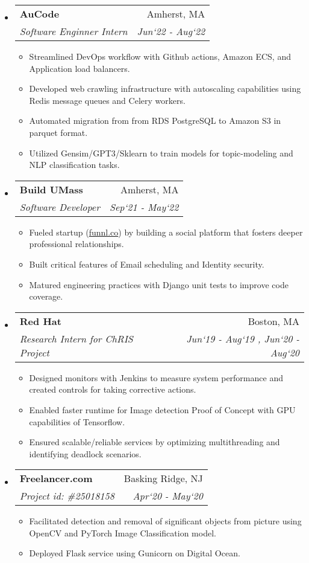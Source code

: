 \documentclass[letterpaper,8pt]{article}
\makeatletter
\newcommand{\resitem}[1]{\item #1 \vspace{-1pt}}
\newcommand{\resheading}[1]{{\normalsize \parashade[.9]{sharpcorners}{\textbf{#1 \vphantom{p\^{E}}}}}}
\newcommand{\ressubheading}[4]{
\begin{tabular*}{6.5in}{l@{\extracolsep{\fill}}r}
		\textbf{#1} & #2 \\
		\textit{#3} & \textit{#4} \\
\end{tabular*}\vspace{-4pt}}
\makeatother
\begin{document}
\resheading{Work Experience}
\begin{itemize}
\item
	\ressubheading{AuCode}{Amherst, MA}{Software Enginner Intern}{Jun`22 - Aug`22}
	\begin{itemize}
		\resitem{Streamlined DevOps workflow with Github actions, Amazon ECS, and Application load balancers.}
		\resitem{Developed web crawling infrastructure with autoscaling capabilities using Redis message queues and Celery workers.}
		\resitem{Automated migration from from RDS PostgreSQL to Amazon S3 in parquet format.}
		\resitem{Utilized Gensim/GPT3/Sklearn to train models for topic-modeling and NLP classification tasks.}
	\end{itemize}

\item
	\ressubheading{Build UMass}{Amherst, MA}{Software Developer}{Sep`21 - May`22}
	\begin{itemize}
		\resitem{Fueled startup (\href{https://funnl.co/}{funnl.co}) by building a social platform that fosters deeper professional relationships.}
		\resitem{Built critical features of Email scheduling and Identity security.}
		\resitem{Matured engineering practices with Django unit tests to improve code coverage.}
	\end{itemize}

\item 
	\ressubheading{Red Hat}{Boston, MA}{Research Intern for ChRIS Project}{Jun`19 - Aug`19 , Jun`20 - Aug`20}
	\begin{itemize}
		\resitem{Designed monitors with Jenkins to measure system performance and created controls for taking corrective actions.}
		\resitem{Enabled faster runtime for Image detection Proof of Concept with GPU capabilities of Tensorflow.}
		\resitem{Ensured scalable/reliable services by optimizing multithreading and identifying deadlock scenarios.}
	\end{itemize}

\item
	\ressubheading{Freelancer.com}{Basking Ridge, NJ}{Project id: \#25018158}{Apr`20 - May`20}
	\begin{itemize}
		\resitem{Facilitated detection and removal of significant objects from picture using OpenCV and PyTorch Image Classification model.}
		\resitem{Deployed Flask service using Gunicorn on Digital Ocean.}
	\end{itemize}

\end{itemize}
\end{document}
